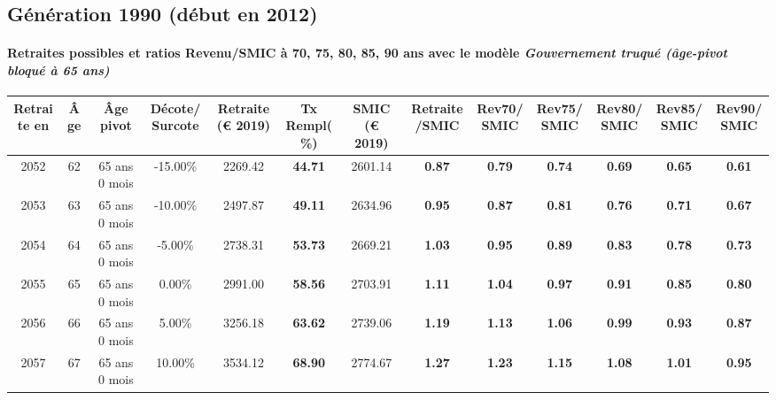 \newpage 
 
\subsection{Génération 1990 (début en 2012)} 

\paragraph{Retraites possibles et ratios Revenu/SMIC à 70, 75, 80, 85, 90 ans avec le modèle \emph{Gouvernement truqué (âge-pivot bloqué à 65 ans)}}  
 
{ \scriptsize \begin{center} 
\begin{tabular}[htb]{|c|c||c|c||c|c||c||c|c|c|c|c|c|} 
\hline 
 Retraite en &  Âge &  Âge pivot &  Décote/Surcote &  Retraite (\euro{} 2019) &  Tx Rempl(\%) &  SMIC (\euro{} 2019) &  Retraite/SMIC &  Rev70/SMIC &  Rev75/SMIC &  Rev80/SMIC &  Rev85/SMIC &  Rev90/SMIC \\ 
\hline \hline 
 2052 &  62 &  65 ans 0 mois &  -15.00\% &  2269.42 &  {\bf 44.71} &  2601.14 &  {\bf {\color{red} 0.87}} &  {\bf {\color{red} 0.79}} &  {\bf {\color{red} 0.74}} &  {\bf {\color{red} 0.69}} &  {\bf {\color{red} 0.65}} &  {\bf {\color{red} 0.61}} \\ 
\hline 
 2053 &  63 &  65 ans 0 mois &  -10.00\% &  2497.87 &  {\bf 49.11} &  2634.96 &  {\bf {\color{red} 0.95}} &  {\bf {\color{red} 0.87}} &  {\bf {\color{red} 0.81}} &  {\bf {\color{red} 0.76}} &  {\bf {\color{red} 0.71}} &  {\bf {\color{red} 0.67}} \\ 
\hline 
 2054 &  64 &  65 ans 0 mois &  -5.00\% &  2738.31 &  {\bf 53.73} &  2669.21 &  {\bf 1.03} &  {\bf {\color{red} 0.95}} &  {\bf {\color{red} 0.89}} &  {\bf {\color{red} 0.83}} &  {\bf {\color{red} 0.78}} &  {\bf {\color{red} 0.73}} \\ 
\hline 
 2055 &  65 &  65 ans 0 mois &  0.00\% &  2991.00 &  {\bf 58.56} &  2703.91 &  {\bf 1.11} &  {\bf 1.04} &  {\bf {\color{red} 0.97}} &  {\bf {\color{red} 0.91}} &  {\bf {\color{red} 0.85}} &  {\bf {\color{red} 0.80}} \\ 
\hline 
 2056 &  66 &  65 ans 0 mois &  5.00\% &  3256.18 &  {\bf 63.62} &  2739.06 &  {\bf 1.19} &  {\bf 1.13} &  {\bf 1.06} &  {\bf {\color{red} 0.99}} &  {\bf {\color{red} 0.93}} &  {\bf {\color{red} 0.87}} \\ 
\hline 
 2057 &  67 &  65 ans 0 mois &  10.00\% &  3534.12 &  {\bf 68.90} &  2774.67 &  {\bf 1.27} &  {\bf 1.23} &  {\bf 1.15} &  {\bf 1.08} &  {\bf 1.01} &  {\bf {\color{red} 0.95}} \\ 
\hline 
\hline 
\end{tabular} 
\end{center} } 
